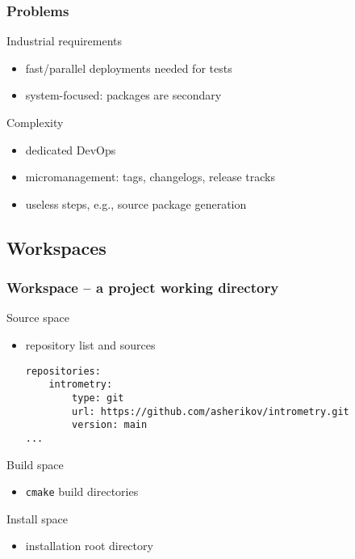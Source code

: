 \documentclass[hyperref={colorlinks=false, breaklinks=true},11pt]{beamer}
\begin{document}
\begin{frame}
    \frametitle{Problems}

    \begin{block}{Industrial requirements}
        \begin{itemize}
            \item fast/parallel deployments needed for tests
            \item system-focused: packages are secondary
        \end{itemize}
    \end{block}

    \begin{block}{Complexity}
        \begin{itemize}
            \item dedicated DevOps
            \item micromanagement: tags, changelogs, release tracks
            \item useless steps, e.g., source package generation
        \end{itemize}
    \end{block}
\end{frame}

\subsection{Workspaces}
\begin{frame}[fragile]
    \frametitle{Workspace -- a project working directory}


    \begin{block}{Source space}
        \begin{itemize}
            \item repository list and sources
\small{
\begin{verbatim}
repositories:
    intrometry:
        type: git
        url: https://github.com/asherikov/intrometry.git
        version: main
...
\end{verbatim}}
        \end{itemize}
    \end{block}

    \begin{block}{Build space}
        \begin{itemize}
            \item \texttt{cmake} build directories
        \end{itemize}
    \end{block}

    \begin{block}{Install space}
        \begin{itemize}
            \item installation root directory
        \end{itemize}
    \end{block}
\end{frame}
\end{document}
